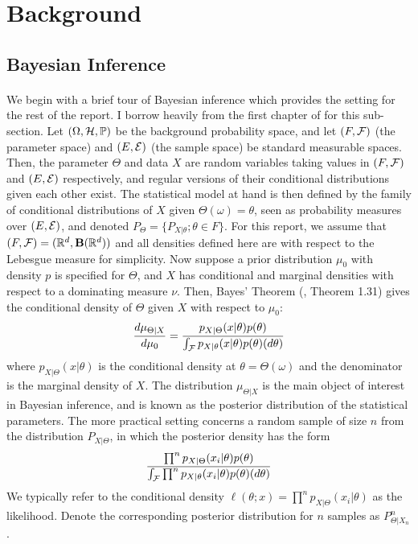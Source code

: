 

\section{Background}

\subsection{Bayesian Inference}

\paragraph{} We begin with a brief tour of Bayesian inference which provides the setting for the rest of the report. I borrow heavily from the first chapter of \cite{Schervish::1995} for this sub-section. Let $(\Omega, \mathcal{H}, \mathbb{P})$ be the background probability space, and let $(F, \mathcal{F})$ (the parameter space) and $(E, \mathcal{E})$ (the sample space) be standard measurable spaces. Then, the parameter $\Theta$ and data $X$ are random variables taking values in $(F, \mathcal{F})$ and $(E, \mathcal{E})$ respectively, and regular versions of their conditional distributions given each other exist. The statistical model at hand is then defined by the family of conditional distributions of $X$ given $\Theta(\omega) = \theta$, seen as probability measures over $(E, \mathcal{E})$, and denoted $P_{\Theta} = \{ P_{X|\theta} ; \theta \in F\}$. For this report, we assume that $(F, \mathcal{F}) = (\mathbb{R}^d, \mathbf{B}(\mathbb{R}^d))$ and all densities defined here are with respect to the Lebesgue measure for simplicity. Now suppose a prior distribution $\mu_0$ with density $p$ is specified for $\Theta$, and $X$ has conditional and marginal densities with respect to a dominating measure $\nu$. Then, Bayes' Theorem (\cite{Schervish::1995}, Theorem 1.31) gives the conditional density of $\Theta$ given $X$ with respect to $\mu_0$:
\begin{equation}
\label{posterior}
\frac{d\mu_{\Theta|X}}{d\mu_0} = \frac{p_{X|\Theta}(x|\theta)p(\theta)}{\int_{\mathcal{F}} p_{X|\theta}(x|\theta)p(\theta)(d\theta)}
\end{equation}
%
where $p_{X|\Theta}(x|\theta)$ is the conditional density at $\theta = \Theta(\omega)$ and the denominator is the marginal density of $X$. The distribution $\mu_{\Theta|X}$ is the main object of interest in Bayesian inference, and is known as the posterior distribution of the statistical parameters. The more practical setting concerns a random sample of size $n$ from the distribution $P_{X|\Theta}$, in which the posterior density has the form
\begin{equation*}
\frac{\prod^n p_{X|\Theta}(x_i|\theta)p(\theta)}{\int_{\mathcal{F}} \prod^np_{X|\theta}(x_i|\theta)p(\theta)(d\theta)}
\end{equation*}
We typically refer to the conditional density $\ell(\theta; x) = \prod^n p_{X|\Theta}(x_i|\theta)$ as the likelihood. Denote the corresponding posterior distribution for $n$ samples as $P^n_{\Theta|X_n}$.
 
